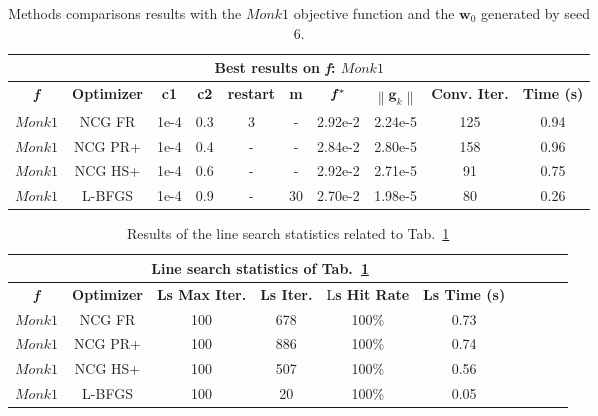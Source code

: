 \documentclass[11pt]{article}
\newcommand{\norm}[1]{\left\lVert#1\right\rVert}
\begin{document}
\begin{table}[H]
\small
    \centering
    \begin{tabular}{ |c|c|c|c|c|c|c|c|c|c|}
    \hline
     \multicolumn{10}{|c|}{\textbf{Best results on \textit{f}: $Monk1$}} \\
      \hline
       \textbf{\textit{f}} & \textbf{Optimizer} & \textbf{c1} &  \textbf{c2} & \textbf{restart} & \textbf{m} & $\mathbf{\textit{\textbf{f}}\,^*}$ & $\norm{\mathbf{g}_k}$ & \textbf{Conv. Iter.} & \textbf{Time (s)}\\
     \hline
      $Monk1$ & NCG FR & 1e-4 & 0.3  & 3  & -  & 2.92e-2  & 2.24e-5 & 125  & 0.94\\
      \hline
      $Monk1$ & NCG PR+ & 1e-4 & 0.4  & -  & -  & 2.84e-2  & 2.80e-5 & 158  & 0.96\\
      \hline
      $Monk1$ & NCG HS+ & 1e-4 & 0.6  & -  & -  & 2.92e-2  & 2.71e-5 & 91  & 0.75\\
      \hline
      $Monk1$ & L-BFGS & 1e-4 & 0.9  & -  & 30  & 2.70e-2  & 1.98e-5 & 80  & 0.26\\
      \hline
    \end{tabular}
    \caption{Methods comparisons results with the $Monk1$ objective function and the $\mathbf{w}_0$ generated by seed 6.}
    \label{tab:monk1_method_comparisons}
\end{table}

\begin{table}[H]
\small
    \centering
    \begin{tabular}{ |c|c|c|c|c|c|c|c|c|c|}
    \hline
     \multicolumn{6}{|c|}{\textbf{Line search statistics of Tab.~\ref{tab:monk1_method_comparisons}}} \\
      \hline
       \textbf{\textit{f}} & \textbf{Optimizer} & \textbf{Ls Max Iter.} &  \textbf{Ls Iter.} & L\textbf{s Hit Rate} & \textbf{Ls Time (s)}\\
     \hline
      $Monk1$ & NCG FR & 100 & 678 & 100\%  & 0.73\\
      \hline
      $Monk1$ & NCG PR+ & 100 & 886 & 100\%  & 0.74\\
      \hline
      $Monk1$ & NCG HS+ & 100 & 507 & 100\%  & 0.56\\
      \hline
      $Monk1$ & L-BFGS & 100 & 20 & 100\%  & 0.05\\
      \hline
    \end{tabular}
    \caption{Results of the line search statistics related to Tab.~\ref{tab:monk1_method_comparisons}}
    \label{tab:monk1_method_comparisons_ls}
\end{table}
\end{document}

